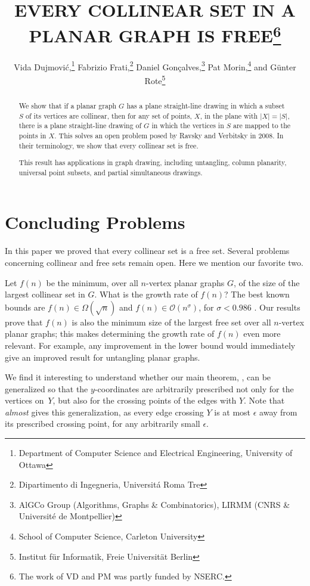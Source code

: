 \documentclass{patmorin}
\title{\MakeUppercase{Every Collinear Set in a Planar Graph Is Free}\thanks{%
    The work of VD and PM was partly funded by NSERC.}}
\author{Vida Dujmovi\'c,\thanks{Department of Computer Science and Electrical Engineering, University of Ottawa}\quad
        Fabrizio Frati,\thanks{Dipartimento di Ingegneria, Universit\'a Roma Tre}\quad 
        Daniel Gon\c{c}alves,\thanks{AlGCo Group (Algorithms, Graphs \& Combinatorics), LIRMM (CNRS \& Universit\'{e} de Montpellier)}\quad
        Pat Morin,\thanks{School of Computer Science, Carleton University}\quad 
        and G\"unter Rote\thanks{Institut f\"ur Informatik, Freie Universit\"at Berlin}}
\begin{document}
\maketitle


\begin{abstract}
  We show that if a planar graph $G$ has a plane straight-line drawing
   in which a subset $S$ of its vertices are collinear, then for any
   set of points, $X$, in the plane with $|X|=|S|$, there is a plane
  straight-line drawing of $G$ in which the vertices in $S$ are
  mapped to the points in $X$.  This solves an open problem posed by
  Ravsky and Verbitsky in 2008.  In their terminology, we show that
  every collinear set is free.
  
  This result has applications in graph drawing, including untangling,
  column planarity, universal point subsets, and partial simultaneous
  drawings.
\end{abstract}






\section{Concluding Problems}

In this paper we proved that every collinear set is a free set. Several problems concerning collinear and free sets remain open. Here we mention our favorite two.

Let $f(n)$ be the minimum, over all $n$-vertex planar graphs $G$, of the size of the largest collinear set in $G$. What is the growth rate of $f(n)$? The best known bounds are $f(n)\in\Omega(\sqrt{n})$ and $f(n)\in \mathcal{O}(n^\sigma)$, for $\sigma < 0.986$ \cite{bose.dujmovic.ea:polynomial,ravsky.verbitsky:on}. Our results prove that $f(n)$ is also the minimum size of the largest free set over all $n$-vertex planar graphs; this makes determining the growth rate of $f(n)$ even more relevant. For example, any improvement in the lower bound would immediately give an improved result for untangling planar graphs.
%

We find it interesting to understand whether our main theorem,
, can be generalized so that the $y$-coordinates are arbitrarily prescribed not only for the vertices on~$Y$, but also for the crossing points of the edges with $Y$. Note that  {\em almost} gives this generalization, as every edge crossing $Y$ is at most $\epsilon$ away from its prescribed crossing point, for any arbitrarily small $\epsilon$. 
\end{document}
